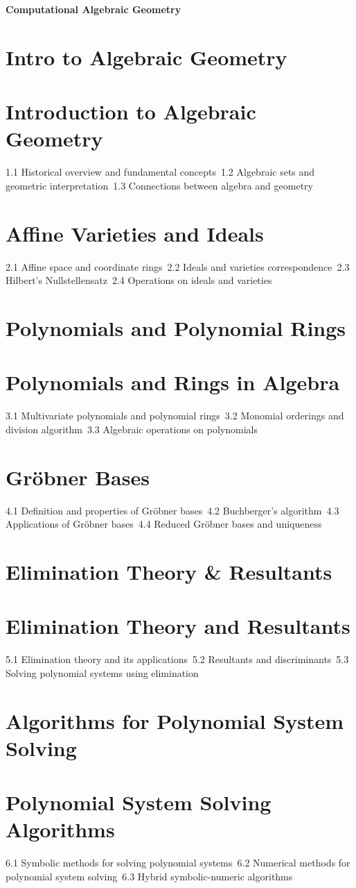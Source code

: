 {\LARGE \bf{Computational Algebraic Geometry}}
\section{Intro to Algebraic Geometry}
\section{Introduction to Algebraic Geometry}
1.1 Historical overview and fundamental concepts\
1.2 Algebraic sets and geometric interpretation\
1.3 Connections between algebra and geometry\
\section{Affine Varieties and Ideals}
2.1 Affine space and coordinate rings\
2.2 Ideals and varieties correspondence\
2.3 Hilbert's Nullstellensatz\
2.4 Operations on ideals and varieties\
\section{Polynomials and Polynomial Rings}
\section{Polynomials and Rings in Algebra}
3.1 Multivariate polynomials and polynomial rings\
3.2 Monomial orderings and division algorithm\
3.3 Algebraic operations on polynomials\
\section{Gröbner Bases}
4.1 Definition and properties of Gröbner bases\
4.2 Buchberger's algorithm\
4.3 Applications of Gröbner bases\
4.4 Reduced Gröbner bases and uniqueness\
\section{Elimination Theory \& Resultants}
\section{Elimination Theory and Resultants}
5.1 Elimination theory and its applications\
5.2 Resultants and discriminants\
5.3 Solving polynomial systems using elimination\
\section{Algorithms for Polynomial System Solving}
\section{Polynomial System Solving Algorithms}
6.1 Symbolic methods for solving polynomial systems\
6.2 Numerical methods for polynomial system solving\
6.3 Hybrid symbolic-numeric algorithms\
